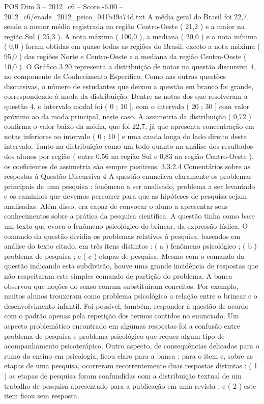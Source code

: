 \begin{textsample}{POS Dim 3 – 2012\_c6 – Score -6.00 – 2012\_c6/enade\_2012\_psico\_041b49a74d.txt}
A média geral do Brasil foi 22,7, sendo a menor média registrada na região Centro-Oeste ( 21,2 ) e a maior na região Sul ( 25,3 ).
A nota máxima ( 100,0 ), a mediana ( 20,0 ) e a nota mínima ( 0,0 ) foram obtidas em quase todas as regiões do Brasil, exceto a nota máxima ( 95,0 ) das regiões Norte e Centro-Oeste e a mediana da região Centro-Oeste ( 10,0 ).
O Gráfico 3.20 representa a distribuição de notas na questão discursiva 4, no componente de Conhecimento Específico.
Como nas outras questões discursivas, o número de estudantes que deixou a questão em branco foi grande, correspondendo à moda da distribuição.
Dentre as notas dos que resolveram a questão 4, o intervalo modal foi ( 0 ; 10 ], com o intervalo ( 20 ; 30 ] com valor próximo ao da moda principal, neste caso.
A assimetria da distribuição ( 0,72 ) confirma o valor baixo da média, que foi 22,7, já que apresenta concentração em notas inferiores ao intervalo ( 0 ; 10 ] e uma cauda longa do lado direito deste intervalo.
Tanto na distribuição como um todo quanto na análise dos resultados dos alunos por região ( entre 0,56 na região Sul e 0,83 na região Centro-Oeste ), os coeficientes de assimetria são sempre positivos. 3.3.2.4 Comentários sobre as respostas à Questão Discursiva 4 A questão enunciava claramente os problemas principais de uma pesquisa : fenômeno a ser analisado, problema a ser levantado e os caminhos que devemos percorrer para que as hipóteses de pesquisa sejam analisadas.
Além disso, era capaz de convocar o aluno a apresentar seus conhecimentos sobre a prática da pesquisa científica.
A questão tinha como base um texto que evoca o fenômeno psicológico do brincar, da expressão lúdica.
O comando da questão dividia os problemas relativos à pesquisa, baseados em análise do texto citado, em três itens distintos : ( a ) fenômeno psicológico ; ( b ) problema de pesquisa ; e ( c ) etapas de pesquisa.
Mesmo com o comando da questão indicando esta subdivisão, houve uma grande incidência de respostas que não respeitaram este simples comando de partição do problema.
A banca observou que noções do senso comum substituíram conceitos.
Por exemplo, muitos alunos trouxeram como problema psicológico a relação entre o brincar e o desenvolvimento infantil.
Foi possível, também, responder à questão de acordo com o padrão apenas pela repetição dos termos contidos no enunciado.
Um aspecto problemático encontrado em algumas respostas foi a confusão entre problema de pesquisa e problema psicológico que requer algum tipo de acompanhamento psicoterápico.
Outro aspecto, de consequências delicadas para o rumo do ensino em psicologia, ficou claro para a banca : para o item c, sobre as etapas de uma pesquisa, ocorreram recorrentemente duas respostas distintas : ( 1 ) as etapas de pesquisa foram confundidas com a distribuição textual de um trabalho de pesquisa apresentado para a publicação em uma revista ; e ( 2 ) este item ficou sem resposta.

\end{textsample}
